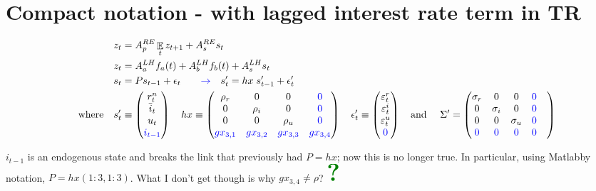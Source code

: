 \documentclass[11pt]{article}
\renewcommand{\[}{\begin{equation}}
\renewcommand{\]}{\end{equation}}
\DeclareMathOperator{\E}{\mathbb{E}}
\newcommand{\bigqm}[1][1]{\text{\larger[#1]{\textbf{?}}}}
\begin{document}
\section{Compact notation - with lagged interest rate term in TR}
 \begin{align}
z_t & = A_p^{RE} \E_t z_{t+1} + A_s^{RE} s_t \label{LOM_RE} \\
z_t & = A_a^{LH} f_a(t) + A_b^{LH} f_b(t) + A_s^{LH} s_t \label{LOM_LH} \\
s_t & = P s_{t-1} + \epsilon_t \quad \quad \textcolor{blue}{\rightarrow} \quad s'_t  = hx \; s'_{t-1} + \epsilon'_t \label{exog} \\
 \quad \text{where} \quad 
 s'_t & \equiv \begin{pmatrix} r_t^n \\ \bar{i}_t \\ u_t \\ \textcolor{blue}{i_{t-1}}
 \end{pmatrix} \quad 
 hx  \equiv \begin{pmatrix} \rho_r & 0 & 0 & \textcolor{blue}{0} \\ 0& \rho_i & 0 & \textcolor{blue}{0} \\ 0&0& \rho_u & \textcolor{blue}{0}  \\ 
 \textcolor{blue}{gx_{3,1}}&\textcolor{blue}{gx_{3,2}}& \textcolor{blue}{gx_{3,3}} & \textcolor{blue}{gx_{3,4}}
 \end{pmatrix}  \quad 
 \epsilon'_t \equiv \begin{pmatrix}\varepsilon_t^{r} \\ \varepsilon_t^{i}  \\ \varepsilon_t^{u} \\ \textcolor{blue}{0} 
 \end{pmatrix}  \quad  \text{and } \quad \Sigma'  =  \begin{pmatrix} \sigma_r & 0 & 0 & \textcolor{blue}{0} \\ 0& \sigma_i & 0 & \textcolor{blue}{0}  \\ 0&0& \sigma_u & \textcolor{blue}{0}  \\ \textcolor{blue}{0}  & \textcolor{blue}{0} & \textcolor{blue}{0} & \textcolor{blue}{0} &
 \end{pmatrix} 
\end{align}

$i_{t-1}$ is an endogenous state and breaks the link that previously had $P = hx$; now this is no longer true. In particular, using Matlabby notation, $P = hx(1:3,1:3)$. What I don't get though is why $gx_{3,4} \neq \rho$? $\textcolor{mygreen}{\bigqm[5]}$ 
\end{document}
